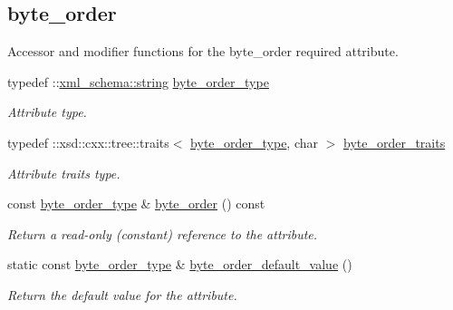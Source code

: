 \subsection*{byte\+\_\+order}
\label{_amgrp4d85380f9aa2c7bfea4b497dbb3373af}%
Accessor and modifier functions for the byte\+\_\+order required attribute. \begin{DoxyCompactItemize}
\item 
typedef \+::\hyperlink{namespacexml__schema_aefbaf353f9a0043af46d23d9040ef268}{xml\+\_\+schema\+::string} \hyperlink{classVTKFile__t_ab08dd45c560dd0635d0e5c0a5e42d2e8}{byte\+\_\+order\+\_\+type}
\begin{DoxyCompactList}\small\item\em Attribute type. \end{DoxyCompactList}\item 
typedef \+::xsd\+::cxx\+::tree\+::traits$<$ \hyperlink{classVTKFile__t_ab08dd45c560dd0635d0e5c0a5e42d2e8}{byte\+\_\+order\+\_\+type}, char $>$ \hyperlink{classVTKFile__t_ae0b8c254bc373d9218ea9eab406b7b98}{byte\+\_\+order\+\_\+traits}
\begin{DoxyCompactList}\small\item\em Attribute traits type. \end{DoxyCompactList}\item 
const \hyperlink{classVTKFile__t_ab08dd45c560dd0635d0e5c0a5e42d2e8}{byte\+\_\+order\+\_\+type} \& \hyperlink{classVTKFile__t_ad87b4f45ca18139b1ffae8ce08dc2e27}{byte\+\_\+order} () const 
\begin{DoxyCompactList}\small\item\em Return a read-\/only (constant) reference to the attribute. \end{DoxyCompactList}\item 
static const \hyperlink{classVTKFile__t_ab08dd45c560dd0635d0e5c0a5e42d2e8}{byte\+\_\+order\+\_\+type} \& \hyperlink{classVTKFile__t_a4538fe428d79eff40025d874e200bec1}{byte\+\_\+order\+\_\+default\+\_\+value} ()
\begin{DoxyCompactList}\small\item\em Return the default value for the attribute. \end{DoxyCompactList}\end{DoxyCompactItemize}
